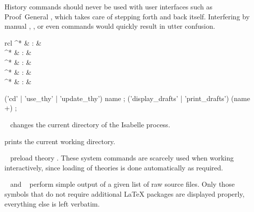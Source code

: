 \begin{isabellebody}
\begin{isamarkuptext}
  \begin{warn}
    History commands should never be used with user interfaces such as
    Proof~General \cite{proofgeneral,Aspinall:TACAS:2000}, which takes
    care of stepping forth and back itself.  Interfering by manual
    , , or even 
    commands would quickly result in utter confusion.
  \end{warn}%
\end{isamarkuptext}%
\isamarkuptrue%
%
\isamarkuptrue%
%
\begin{isamarkuptext}%
\begin{matharray}{rcl}
    ^* & : & \isarkeep{\cdot} \\
    ^* & : & \isarkeep{\cdot} \\
    ^* & : & \isarkeep{\cdot} \\
    ^* & : & \isarkeep{\cdot} \\
    ^* & : & \isarkeep{\cdot} \\
  \end{matharray}

  \begin{rail}
    ('cd' | 'use\_thy' | 'update\_thy') name
    ;
    ('display\_drafts' | 'print\_drafts') (name +)
    ;
  \end{rail}

  \begin{descr}

  \item [\isa{\isacommand{cd}}~\isa{path}] changes the current directory
  of the Isabelle process.

  \item [\isa{\isacommand{pwd}}] prints the current working directory.

  \item [\isa{\isacommand{use{\isacharunderscore}thy}}~\isa{A}] preload theory .
  These system commands are scarcely used when working interactively,
  since loading of theories is done automatically as required.

  \item [\isa{\isacommand{display{\isacharunderscore}drafts}}~\isa{paths} and \isa{\isacommand{print{\isacharunderscore}drafts}}~\isa{paths}] perform simple output of a given list
  of raw source files.  Only those symbols that do not require
  additional {\LaTeX} packages are displayed properly, everything else
  is left verbatim.

  \end{descr}%
\end{isamarkuptext}%
\isamarkuptrue%
%
\isadelimtheory
%
\endisadelimtheory
%
\isatagtheory
{}\isamarkupfalse%
%
\endisatagtheory
{\isafoldtheory}%
%
\isadelimtheory
%
\endisadelimtheory
\isanewline
\end{isabellebody}%
